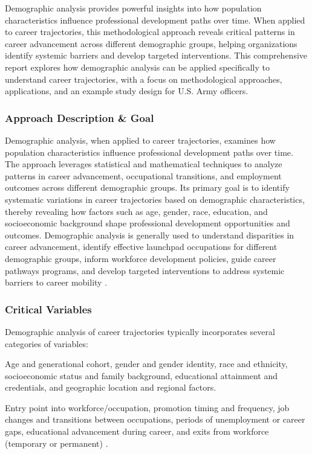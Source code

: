 \documentclass[../main.tex]{subfiles}
\begin{document}
Demographic analysis provides powerful insights into how population characteristics influence professional development paths over time. When applied to career trajectories, this methodological approach reveals critical patterns in career advancement across different demographic groups, helping organizations identify systemic barriers and develop targeted interventions. This comprehensive report explores how demographic analysis can be applied specifically to understand career trajectories, with a focus on methodological approaches, applications, and an example study design for U.S. Army officers.

\subsubsection{Approach Description \& Goal}

Demographic analysis, when applied to career trajectories, examines how population characteristics influence professional development paths over time. The approach leverages statistical and mathematical techniques to analyze patterns in career advancement, occupational transitions, and employment outcomes across different demographic groups. Its primary goal is to identify systematic variations in career trajectories based on demographic characteristics, thereby revealing how factors such as age, gender, race, education, and socioeconomic background shape professional development opportunities and outcomes. Demographic analysis is generally used to understand disparities in career advancement, identify effective launchpad occupations for different demographic groups, inform workforce development policies, guide career pathways programs, and develop targeted interventions to address systemic barriers to career mobility \citep{dol2023building, nataraj2018career}.

\subsubsection{Critical Variables}

Demographic analysis of career trajectories typically incorporates several categories of variables:

 Age and generational cohort, gender and gender identity, race and ethnicity, socioeconomic status and family background, educational attainment and credentials, and geographic location and regional factors.

 Entry point into workforce/occupation, promotion timing and frequency, job changes and transitions between occupations, periods of unemployment or career gaps, educational advancement during career, and exits from workforce (temporary or permanent) \citep{nataraj2018career}.
\end{document}
